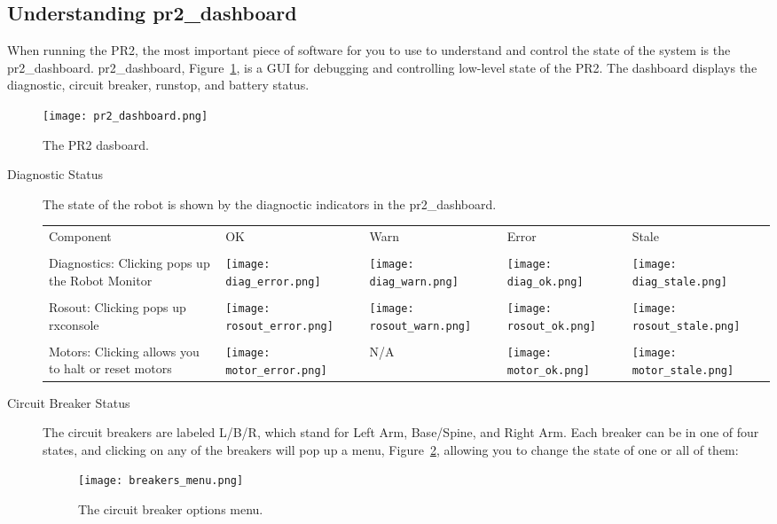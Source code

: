 \subsection{Understanding pr2\_dashboard}
When running the PR2, the most important piece of software for you to use to understand and control the state of the system is the pr2\_dashboard.
pr2\_dashboard, Figure~\ref{fig:dashboard}, is a GUI for debugging and controlling low-level state of the PR2. The dashboard displays the diagnostic, 
circuit breaker, runstop, and battery status.
\begin{figure}[h]
\centering
\texttt{[image: pr2\_dashboard.png]}
\caption{The PR2 dasboard.}
\label{fig:dashboard}
\end{figure}
\begin{description}
\item[Diagnostic Status] The state of the robot is shown by the diagnoctic indicators in the pr2\_dashboard. \\

    \begin{tabular}{m{6cm}SSSS}
    Component & OK & Warn & Error & Stale\\
    &&&&\\
    Diagnostics: Clicking pops up the Robot Monitor & \texttt{[image: diag\_error.png]}&\texttt{[image: diag\_warn.png]}&
                                                      \texttt{[image: diag\_ok.png]}&\texttt{[image: diag\_stale.png]}\\
    &&&&\\
    Rosout: Clicking pops up rxconsole & \texttt{[image: rosout\_error.png]}&\texttt{[image: rosout\_warn.png]}&
                                        \texttt{[image: rosout\_ok.png]}&\texttt{[image: rosout\_stale.png]}\\
    &&&&\\
    Motors: Clicking allows you to halt or reset motors & \texttt{[image: motor\_error.png]}& N/A &
                                                          \texttt{[image: motor\_ok.png]}&\texttt{[image: motor\_stale.png]}\\
   \end{tabular}

\item[Circuit Breaker Status] The circuit breakers are labeled L/B/R, which stand for Left Arm, Base/Spine, and Right Arm. 
Each breaker can be in one of four states, and clicking on any of the breakers will pop up a menu, Figure~\ref{fig:breaker_menu}, allowing you to change 
the state of one or all of them:
\begin{figure}[h]
\centering
\texttt{[image: breakers\_menu.png]}
\caption{The circuit breaker options menu.}
\label{fig:breaker_menu}
\end{figure}


\end{description}
